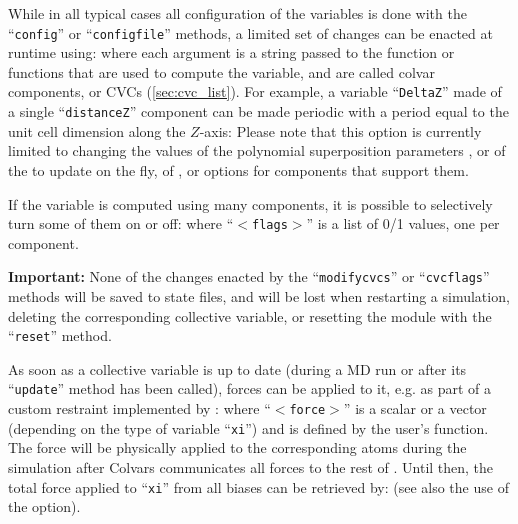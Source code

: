 {While in all typical cases all configuration of the variables is done with the ``\texttt{config}'' or ``\texttt{configfile}'' methods, a limited set of changes can be enacted at runtime using:
\noindent{}where each argument is a string passed to the function or functions that are used to compute the variable, and are called colvar components, or CVCs (\ref{sec:cvc_list}).
For example, a variable ``\texttt{DeltaZ}'' made of a single ``\texttt{distanceZ}'' component can be made periodic with a period equal to the unit cell dimension along the $Z$-axis:
\noindent{}Please note that this option is currently limited to changing the values of the polynomial superposition parameters , or of the  to update on the fly, of ,  or  options for components that support them.

If the variable is computed using many components, it is possible to selectively turn some of them on or off:
\noindent{}where ``\texttt{$<$flags$>$}'' is a list of 0/1 values, one per component.
\ifdefined{}\fi

\textbf{Important:} None of the changes enacted by the ``\texttt{modifycvcs}'' or ``\texttt{cvcflags}'' methods will be saved to state files, and will be lost when restarting a simulation, deleting the corresponding collective variable, or resetting the module with the  ``\texttt{reset}'' method.


As soon as a collective variable is up to date (during a MD run or after its ``\texttt{update}'' method has been called), forces can be applied to it, e.g.{} as part of a custom restraint implemented by :
\noindent{}where ``\texttt{$<$force$>$}'' is a scalar or a vector (depending on the type of variable ``\texttt{xi}'') and is defined by the user's function.
The force will be physically applied to the corresponding atoms during the simulation after Colvars communicates all forces to the rest of \MDENGINE{}.
Until then, the total force applied to ``\texttt{xi}'' from all biases can be retrieved by:
\noindent{}(see also the use of the  option).

}
